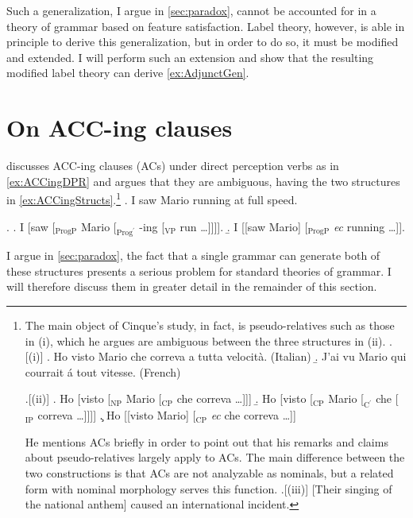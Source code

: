 \documentclass[MilwayThesis]{subfiles}
\begin{document}
Such a generalization, I argue in \cref{sec:paradox}, cannot be accounted for in a theory of grammar based on feature satisfaction.
Label theory, however, is able in principle to derive this generalization, but in order to do so, it must be modified and extended.
I will perform such an extension and show that the resulting modified label theory can derive \cref{ex:AdjunctGen}.

\section{On ACC-ing clauses}

\textcite{cinque1996pseudo} discusses ACC-ing clauses (ACs) under direct perception verbs as in \cref{ex:ACCingDPR} and argues that they are ambiguous, having the two structures in \cref{ex:ACCingStructs}.\footnote{
	The main object of Cinque's study, in fact, is pseudo-relatives such as those in (i), which he argues are ambiguous between the three structures in (ii).
	\ex.[(i)]\label{ex:PR}
	\a. Ho visto Mario che correva a tutta velocit\`a. (Italian)
	\b. J'ai vu Mario qui courrait \'a tout vitesse. (French)

	\ex.[(ii)]\label{ex:PRStruct}
	\a. Ho [visto [$_\text{NP}$ Mario [$_\text{CP}$ che correva \ldots ]]]
	\b. Ho [visto [$_\text{CP}$ Mario [$_{\text{C}^\prime}$ che [$_\text{IP}$ correva \ldots ]]]]
	\c. Ho [[visto Mario] [$_\text{CP}$ \textit{ec} che correva \ldots]]

	He mentions ACs briefly in order to point out that his remarks and claims about pseudo-relatives largely apply to ACs.
	The main difference between the two constructions is that ACs are not analyzable as nominals, but a related form with nominal morphology serves this function.
	\ex.[(iii)] [Their singing of the national anthem] caused an international incident.

}
\ex. I saw Mario running at full speed. \label{ex:ACCingDPR} 

\ex.\label{ex:ACCingStructs}
\a. I [saw [$_\text{ProgP}$ Mario [$_{\text{Prog}^\prime}$ -ing [$_\text{VP}$ run \ldots]]]].
\b. I [[saw Mario] [$_\text{ProgP}$ \textit{ec} running \ldots]].

I argue in \cref{sec:paradox}, the fact that a single grammar can generate both of these structures presents a serious problem for standard theories of grammar.
I will therefore discuss them in greater detail in the remainder of this section.
\end{document}
